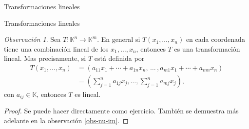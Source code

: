\documentclass[a4paper,12pt,twoside,spanish,reqno]{amsbook}
\numberwithin{equation}{section}
\theoremstyle{definition}
\theoremstyle{remark}
\newtheorem{obs}[teorema]{Observaci\'on}
\newcommand{\K}{\mathbb K}
\begin{document}
\begin{chapter}{Transformaciones lineales}
\begin{section}{Transformaciones lineales}
            \begin{obs}\label{obs-tl-1.5} 	Sea $T: \K^n \to \K^m$. En  general si $T(x_1,\ldots,x_n)$ en cada coordenada tiene una combinación lineal de los $x_1,\ldots,x_n$,  entonces $T$ es una transformación lineal. Mas precisamente, si $T$ está definida por
                \begin{align*}
                T(x_1,\ldots,x_n) &= (a_{11}x_1+\cdots + a_{1n}x_n,\, \ldots\,,a_{m1}x_1+\cdots + a_{mn}x_n )\\
                &=(\sum_{j=1}^n a_{1j} x_j,\ldots,\sum_{j=1}^n a_{mj} x_j),
                \end{align*}
                con $a_{ij} \in \K$, entonces $T$  es lineal. 
            \end{obs}
            \begin{proof} Se puede hacer directamente como ejercicio. También se demuestra más adelante en la observación \ref{obs-nu-im}. 
            \begin{comment}
                Sean $(x_1,\cdots,x_n), (y_1,\cdots,y_n) \in \K^n$ y $\lambda \in \K$,  entonces
                \begin{align*}
                T(\lambda(x_1,\cdots,x_n)+ (y_1,\cdots,y_n)) &= T(\lambda x_1+y_1,\ldots,\lambda x_n+y_n) \\
                &= (\sum_{j=1}^n a_{1j} (\lambda x_j+y_j),\ldots,\sum_{j=1}^n a_{mj} (\lambda x_j+y_j)) \\
                &= (\lambda\sum_{j=1}^n a_{1j} x_j+\sum_{j=1}^n a_{1j} y_j,\ldots,\lambda\sum_{j=1}^n a_{mj} x_j+\sum_{j=1}^n a_{mj} y_j) \\
                &= \lambda(\sum_{j=1}^n a_{1j} x_j,\ldots,\sum_{j=1}^n a_{mj} x_j) +(\sum_{j=1}^n a_{1j} y_j,\ldots,\sum_{j=1}^n a_{mj} y_j) \\
                & =\lambda T(x_1,\cdots,x_n)+ T(y_1,\cdots,y_n).
                \end{align*}
            \end{comment}
            \end{proof}
            

\end{section}
\end{chapter}
\end{document}
